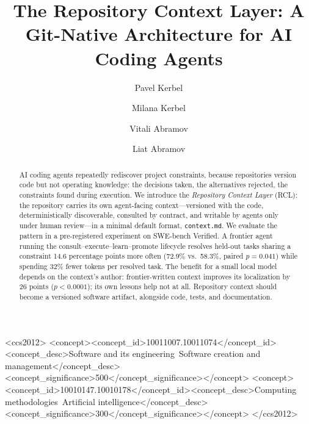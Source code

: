 \documentclass[sigconf,nonacm]{acmart}
\newcommand{\ctx}{\texttt{context.md}}
\begin{document}
\title{The Repository Context Layer: A Git-Native Architecture for AI Coding Agents}

\author{Pavel Kerbel}
\author{Milana Kerbel}
\author{Vitali Abramov}
\author{Liat Abramov}

\begin{abstract}
AI coding agents repeatedly rediscover project constraints, because repositories version code but not operating knowledge: the decisions taken, the alternatives rejected, the constraints found during execution. We introduce the \emph{Repository Context Layer} (RCL): the repository carries its own agent-facing context---versioned with the code, deterministically discoverable, consulted by contract, and writable by agents only under human review---in a minimal default format, \ctx{}. We evaluate the pattern in a pre-registered experiment on SWE-bench Verified. A frontier agent running the consult--execute--learn--promote lifecycle resolves held-out tasks sharing a constraint 14.6 percentage points more often (72.9\% vs.\ 58.3\%, paired $p=0.041$) while spending 32\% fewer tokens per resolved task. The benefit for a small local model depends on the context's author: frontier-written context improves its localization by 26 points ($p<0.0001$); its own lessons help not at all. Repository context should become a versioned software artifact, alongside code, tests, and documentation.
\end{abstract}

\begin{CCSXML}
<ccs2012>
<concept><concept_id>10011007.10011074</concept_id><concept_desc>Software and its engineering~Software creation and management</concept_desc><concept_significance>500</concept_significance></concept>
<concept><concept_id>10010147.10010178</concept_id><concept_desc>Computing methodologies~Artificial intelligence</concept_desc><concept_significance>300</concept_significance></concept>
</ccs2012>
\end{CCSXML}
\end{document}
